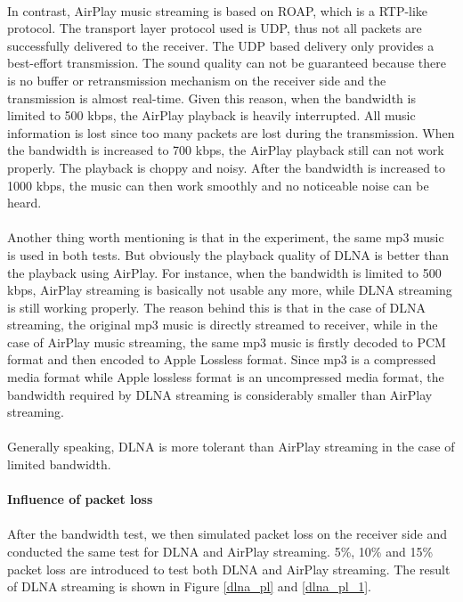 \\
In contrast, AirPlay music streaming is based on ROAP, which is a RTP-like protocol. The transport layer protocol used is UDP, thus not all packets are successfully delivered to the receiver. The UDP based delivery only provides a best-effort transmission. The sound quality can not be guaranteed because there is no buffer or retransmission mechanism on the receiver side and the transmission is almost real-time. Given this reason, when the bandwidth is limited to 500 kbps, the AirPlay playback is heavily interrupted. All music information is lost since too many packets are lost during the transmission. When the bandwidth is increased to 700 kbps, the AirPlay playback still can not work properly. The playback is choppy and noisy. After the bandwidth is increased to 1000 kbps, the music can then work smoothly and no noticeable noise can be heard.\\
\\
Another thing worth mentioning is that in the experiment, the same mp3 music is used in both tests. But obviously the playback quality of DLNA is better than the playback using AirPlay. For instance, when the bandwidth is limited to 500 kbps, AirPlay streaming is basically not usable any more, while DLNA streaming is still working properly. The reason behind this is that in the case of DLNA streaming, the original mp3 music is directly streamed to receiver, while in the case of AirPlay music streaming, the same mp3 music is firstly decoded to PCM format and then encoded to Apple Lossless format. Since mp3 is a compressed media format while Apple lossless format is an uncompressed media format, the bandwidth required by DLNA streaming is considerably smaller than AirPlay streaming.\\
\\
Generally speaking, DLNA is more tolerant than AirPlay streaming in the case of limited bandwidth.\\
\\
\textbf{Influence of packet loss}\\
\\
After the bandwidth test, we then simulated packet loss on the receiver side and
conducted the same test for DLNA and AirPlay streaming. 5\%, 10\% and 15\%
packet loss are introduced to test both DLNA and AirPlay streaming. The result
of DLNA streaming is shown in Figure \ref{dlna_pl} and \ref{dlna_pl_1}.
